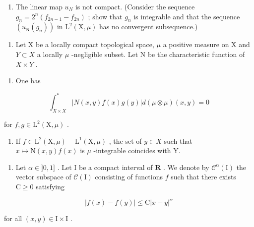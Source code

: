 \begin{enumerate}
\def\labelenumi{\alph{enumi})}
\setcounter{enumi}{3}
\tightlist
\item
  The linear map \(u_{N}\) is not compact. (Consider the sequence \(g_{n}=2^{n}(f_{2n-1}-f_{2n})\) ; show that \(g_{n}\) is integrable and that the sequence \((u_{\mathrm{N}}(g_{n}))\) in \(\mathrm{L}^{2}(\mathrm{X},\mu)\) has no convergent subsequence.)
\end{enumerate}

\begin{enumerate}
\def\labelenumi{\arabic{enumi})}
\setcounter{enumi}{2}
\tightlist
\item
  Let X be a locally compact topological space, \(\mu\) a positive measure on X and \(Y \subset X\) a locally \(\mu\) -negligible subset. Let N be the characteristic function of \(X \times Y\) .
\end{enumerate}

\begin{enumerate}
\def\labelenumi{\alph{enumi})}
\tightlist
\item
  One has
\end{enumerate}

\[
\int_ {X \times X} ^ {*} | N (x, y) f (x) g (y) | d (\mu \otimes \mu) (x, y) = 0
\]

for \(f, g \in \mathrm{L}^2(\mathrm{X}, \mu)\) .

\begin{enumerate}
\def\labelenumi{\alph{enumi})}
\setcounter{enumi}{1}
\tightlist
\item
  If \(f \in \mathrm{L}^{2}(\mathrm{X}, \mu) - \mathrm{L}^{1}(\mathrm{X}, \mu)\) , the set of \(y \in X\) such that \(x \mapsto \mathrm{N}(x, y)f(x)\) is \(\mu\) -integrable coincides with Y.
\end{enumerate}

\begin{enumerate}
\def\labelenumi{\arabic{enumi})}
\setcounter{enumi}{3}
\tightlist
\item
  Let \(\alpha \in ]0,1]\) . Let I be a compact interval of \(\mathbf{R}\) . We denote by \(\mathcal{C}^{\alpha}(\mathrm{I})\) the vector subspace of \(\mathcal{C}(\mathrm{I})\) consisting of functions \(f\) such that there exists \(\mathrm{C} \geqslant 0\) satisfying
\end{enumerate}

\[
| f (x) - f (y) | \leqslant \mathrm{C} | x - y | ^ {\alpha}
\]

for all \((x,y)\in\mathrm{I}\times\mathrm{I}\) .

